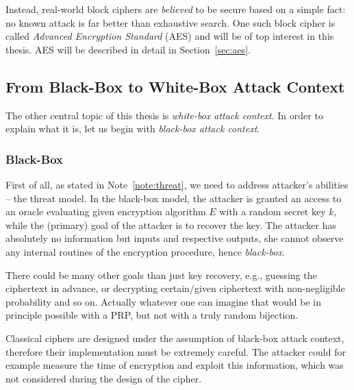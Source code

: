 Instead, real-world block ciphers are {\em believed} to be secure \cite{menezes1996handbook} based on a simple fact: no known attack is far better than exhaustive search. One such block cipher is called {\em Advanced Encryption Standard} (AES) and will be of top interest in this thesis. AES will be described in detail in Section~\ref{sec:aes}.



\subsection{From Black-Box to White-Box Attack Context}
\label{sec:bbtowb}

The other central topic of this thesis is {\em white-box attack context}. In order to explain what it is, let us begin with {\em black-box attack context}.

\subsubsection{Black-Box}

First of all, as stated in Note~\ref{note:threat}, we need to address attacker's abilities -- the threat model. In the black-box model, the attacker is granted an access to an oracle evaluating given encryption algorithm $E$ with a random secret key $k$, while the (primary) goal of the attacker is to recover the key. The attacker has absolutely no information but inputs and respective outputs, she cannot observe any internal routines of the encryption procedure, hence {\em black-box}.

\begin{note}
	There could be many other goals than just key recovery, e.g., guessing the ciphertext in advance, or decrypting certain/given ciphertext with non-negligible probability and so on. Actually whatever one can imagine that would be in principle possible with a PRP, but not with a truly random bijection.
\end{note}

Classical ciphers are designed under the assumption of black-box attack context, therefore their implementation must be extremely careful. The attacker could for example measure the time of encryption and exploit this information, which was not considered during the design of the cipher.

